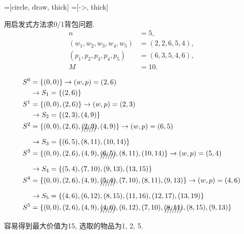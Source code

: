\documentclass[../../main.tex]{subfiles}
\begin{document}
=[circle, draw, thick]
=[->, thick]
\begin{problem}
    用启发式方法求0/1背包问题.
    \begin{align*}
        n &= 5, \\
        (w_1, w_2, w_3, w_4, w_5) &= (2, 2, 6, 5, 4), \\
        (p_1, p_2, p_3, p_4, p_5) &= (6, 3, 5, 4, 6), \\
        M &= 10.
    \end{align*}
\end{problem}
\begin{solution}
    \begin{align*}
    S^0 &= \{(0,0)\} \rightarrow (w,p) = (2,6)  \\
    &\rightarrow S_1 = \{(2,6)\} 
    \\
    S^1 &= \{(0,0), (2,6)\} \rightarrow (w,p) = (2,3) \\ 
    &\rightarrow S_2 = \{(2,3),(4,9)\} 
    \\
    S^2 &= \{(0,0),(2,6),\xout{(2,3)},(4,9)\} \rightarrow (w,p) = (6,5) \\ 
    &\rightarrow S_3 = \{(6,5),(8,11),(10,14)\} 
    \\
    S^3 &= \{(0,0),(2,6),(4,9),\xout{(6,5)},(8,11),(10,14)\} \rightarrow (w,p) = (5,4) \\
    &\rightarrow S_4 = \{(5,4),(7,10),(9,13),(13,15)\} 
    \\
    S^4 &= \{(0,0),(2,6),(4,9),\xout{(5,4)},(7,10),(8,11),(9,13)\}  \rightarrow (w,p) = (4,6) \\
    &\rightarrow S_5 = \{(4,6),(6,12),(8,15),(11,16),(12,17),(13,19)\} 
    \\
    S^5 &= \{(0,0),(2,6),(4,9),\xout{(4,6)},(6,12),(7,10),\xout{(8,11)},(8,15),(9,13)\}
\end{align*}
    容易得到最大价值为15, 选取的物品为1, 2, 5.  
\end{solution}
\end{document}
